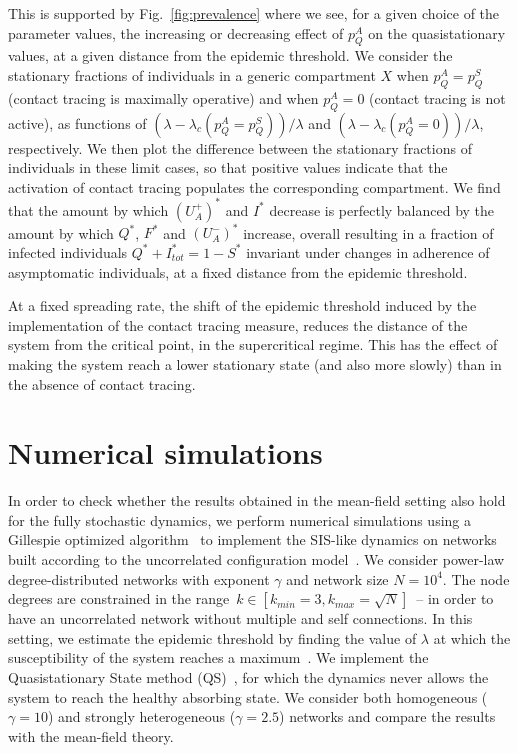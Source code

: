 \documentclass[aps,twocolumn,superscriptaddress,nofootinbib,pre,floatfix]{revtex4-1}
\begin{document}
This is supported by Fig.~\ref{fig:prevalence} where we see, for a
given choice of the parameter values, the increasing or decreasing
effect of $p_Q^A$ on the quasistationary values, at a given distance
from the epidemic threshold. We consider the stationary fractions of individuals in
a generic compartment $X$ when $p_Q^A = p_Q^S$ (contact tracing is
maximally operative) and when $p_Q^A = 0$ (contact tracing is not
active), as functions of $(\lambda-\lambda_c(p_Q^A=p_Q^S))/\lambda$
and $(\lambda-\lambda_c(p_Q^A=0))/\lambda$, respectively. We then plot
the difference between the stationary fractions of individuals in these limit cases,
so that positive values indicate that the activation of contact
tracing populates the corresponding compartment.  We find that the
amount by which $(U_A^+)^*$ and $I^*$ decrease is perfectly balanced by
the amount by which $Q^*$, $F^*$ and $(U_A^-)^*$ increase, overall
resulting in a fraction of infected individuals $Q^* + I_{tot}^* = 1 -
S^*$ invariant under changes in adherence of asymptomatic individuals,
at a fixed distance from the epidemic threshold.

At a fixed spreading rate, the shift of the epidemic
  threshold induced by the implementation of the contact tracing measure,
  reduces the distance of the system from the critical point, in
  the supercritical regime. This has the effect of making the system
  reach a lower stationary state (and also more slowly) than in the
  absence of contact tracing.

\section{Numerical simulations}

In order to check whether the results obtained in the
mean-field setting also hold for the fully stochastic dynamics,
we perform numerical simulations using a Gillespie
optimized algorithm~\cite{Cota2017} to implement the SIS-like dynamics
on networks built according to the uncorrelated configuration
model~\cite{Catanzaro2005}.
We consider power-law degree-distributed networks with
exponent $\gamma$ and network size $N=10^4$.
The node degrees are constrained in the
range~$k \in [k_{min} = 3, k_{max} = \sqrt{N}]$~-- in order to
have an uncorrelated network without multiple and self connections.
In this setting, we estimate the epidemic threshold by finding the
value of $\lambda$ at which the susceptibility of the system reaches a
maximum~\cite{Ferreira2012}.
We implement the Quasistationary State method (QS)~\cite{Ferreira2012},
for which the dynamics never allows the system to reach the healthy
absorbing state.
We consider both homogeneous ($\gamma=10$) and strongly
heterogeneous ($\gamma=2.5$) networks and compare the results with
the mean-field theory.
\end{document}
